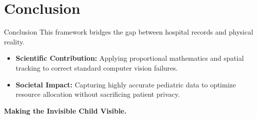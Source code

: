 \section{Conclusion}

\begin{frame}{Conclusion}
    This framework bridges the gap between hospital records and physical reality. 
    \begin{itemize}
        \item \textbf{Scientific Contribution:} Applying proportional mathematics and spatial tracking to correct standard computer vision failures.
        \item \textbf{Societal Impact:} Capturing highly accurate pediatric data to optimize resource allocation without sacrificing patient privacy.
    \end{itemize}
    \begin{center}
        \textbf{Making the Invisible Child Visible.}
    \end{center}
\end{frame}

